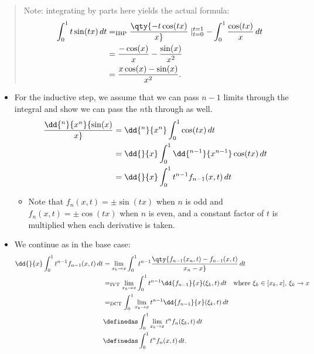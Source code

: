 \begin{solution}
\begin{quote}
Note: integrating by parts here yields the actual formula:
\begin{align*}
\int_0^1 t\sin(tx) \,dt 
&=_{\text{IBP}} \qty{-t\cos(tx) \over x}\mid_{t=0}^{t=1} - \int_0^1 {\cos(tx) \over x} \,dt \\
&= {-\cos(x) \over x} - {\sin(x) \over x^2} \\
&= {x\cos(x) - \sin(x) \over x^2}
.\end{align*}
\end{quote}

\begin{itemize}
\tightlist
\item
  For the inductive step, we assume that we can pass \(n-1\) limits
  through the integral and show we can pass the \(n\)th through as well.
  \begin{align*}
  \dd{^n}{x^n} {\sin(x) \over x} 
  &= \dd{^n}{x^n} \int_0^1 \cos(tx)\,dt  \\
  &= \dd{}{x} \int_0^1 \dd{^{n-1}}{x^{n-1}} \cos(tx)\,dt  \\
  &= \dd{}{x} \int_0^1 t^{n-1} f_{n-1}(x, t) \,dt 
  \end{align*}

  \begin{itemize}
  \tightlist
  \item
    Note that \(f_n(x, t) = \pm \sin(tx)\) when \(n\) is odd and
    \(f_n(x, t) = \pm \cos(tx)\) when \(n\) is even, and a constant
    factor of \(t\) is multiplied when each derivative is taken.
  \end{itemize}
\item
  We continue as in the base case:
  \begin{align*}
  \dd{}{x} \int_0^1 t^{n-1} f_{n-1}(x, t) \,dt 
  &= \lim_{x_k\to x} \int_0^1 t^{n-1} \qty{ f_{n-1}(x_n, t) - f_{n-1}(x, t) \over x_n - x} \,dt \\
  &=_{\text{IVT}} \lim_{x_k\to x} \int_0^1 t^{n-1} \dd{f_{n-1}}{x}(\xi_k, t) \,dt \quad\text{where } \xi_k\in [x_k, x],\, \xi_k \to x \\
  &=_{\text{DCT}} \int_0^1 \lim_{x_k\to x} t^{n-1} \dd{f_{n-1}}{x}(\xi_k, t) \,dt \\
  &\definedas \int_0^1 \lim_{x_k\to x} t^{n} f_n(\xi_k, t) \,dt \\
  &\definedas \int_0^1 t^{n} f_n(x, t) \,dt 
  .\end{align*}


\end{itemize}
\end{solution}
